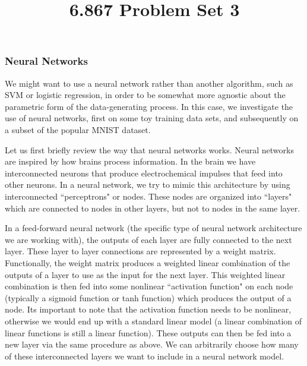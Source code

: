 \documentclass[10pt]{article}
\begin{document}
	\title{6.867 Problem Set 3}
	\maketitle
	
\subsubsection*{Neural Networks}

We might want to use a neural network rather than another algorithm, such as SVM or logistic regression, in order to be somewhat more agnostic about the parametric form of the data-generating process. In this case, we investigate the use of neural networks, first on some toy training data sets, and subsequently on a subset of the popular MNIST dataset.

Let us first briefly review the way that neural networks works. Neural networks are inspired by how brains process information. In the brain we have interconnected neurons that produce electrochemical impulses that feed into other neurons. In a neural network, we try to mimic this architecture by using interconnected ``perceptrons" or nodes. These nodes are organized into ``layers" which are connected to nodes in other layers, but not to nodes in the same layer. 

In a feed-forward neural network (the specific type of neural network architecture we are working with), the outputs of each layer are fully connected to the next layer. These layer to layer connections are represented by a weight matrix. Functionally, the weight matrix produces a weighted linear combination of the outputs of a layer to use as the input for the next layer. This weighted linear combination is then fed into some nonlinear ``activation function" on each node (typically a sigmoid function or tanh function) which produces the output of a node. Its important to note that the activation function needs to be nonlinear, otherwise we would end up with a standard linear model (a linear combination of linear functions is still a linear function). These outputs can then be fed into a new layer via the same procedure as above. We can arbitrarily choose how many of these interconnected layers we want to include in a neural network model. 
\end{document}
